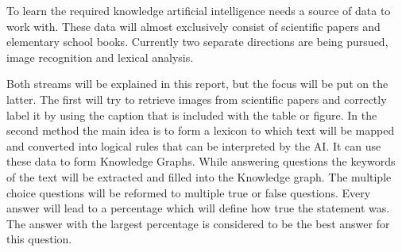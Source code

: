 To learn the required knowledge artificial intelligence needs a source of data to work with.
These data will almost exclusively consist of scientific papers and elementary school books. 
Currently two separate directions are being pursued, image recognition and lexical analysis.

Both streams will be explained in this report, but the focus will be put on the latter.
The first will try to retrieve images from scientific papers and correctly label it by using the caption that is included with the table or figure.
In the second method the main idea is to form a lexicon to which text will be mapped and converted into logical rules that can be interpreted by the AI.
It can use these data to form Knowledge Graphs.
While answering questions the keywords of the text will be extracted and filled into the Knowledge graph.
The multiple choice questions will be reformed to multiple true or false questions. 
Every answer will lead to a percentage which will define how true the statement was.
The answer with the largest percentage is considered to be the best answer for this question.
